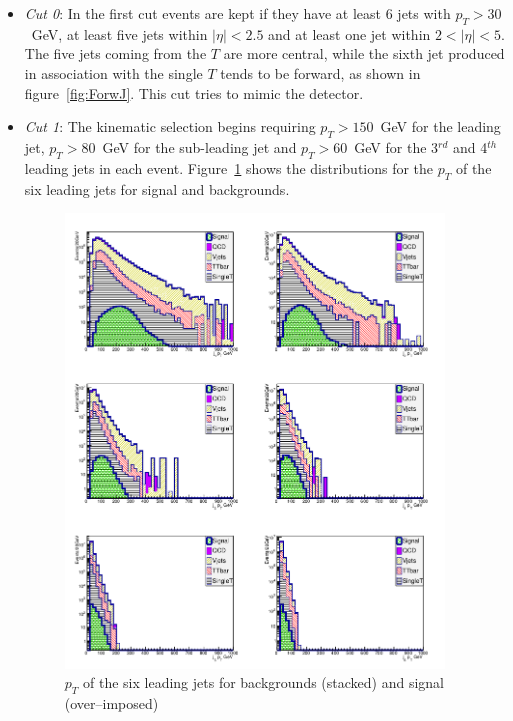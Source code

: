 \begin{itemize}

\item \textit{Cut 0}: In the first cut events are kept if they have at least 6 jets with $p_T > 30$~GeV, at least five jets within $|\eta|<2.5$ and at least one jet within $2<|\eta|<5$. The five jets coming from the $T$ are more central, while the sixth jet produced in association with the single $T$ tends to be forward, as shown in figure~\ref{fig:ForwJ}. This cut tries to mimic the detector.

\item \textit{Cut 1}: The kinematic selection begins requiring $p_{T}>150$~GeV for the leading jet, $p_{T}>80$~GeV for the sub-leading jet and $p_{T}>60$~GeV for the 3$^{rd}$ and 4$^{th}$ leading jets in each event. Figure~\ref{fig:Var1} shows the distributions for the $p_{T}$ of the six leading jets for signal and backgrounds.

\begin{figure}[!Hhtbp]
  \begin{center}
    \includegraphics[width=0.95\textwidth]{figs/Pheno/JetPt.png}
    \caption{$p_{T}$  of the six leading jets for backgrounds (stacked) and signal (over--imposed)}
    \label{fig:Var1}
  \end{center}
\end{figure}


\end{itemize}
